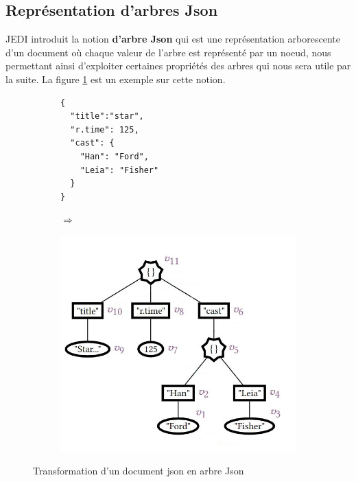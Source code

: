         \subsection{Représentation d'arbres Json}   
            JEDI \cite{JEDI} introduit la notion \textbf{d'arbre Json} qui est une représentation arborescente d'un document où chaque valeur de l'arbre est représenté par un noeud, nous permettant ainsi d'exploiter 
            certaines propriétés des arbres qui nous sera utile par la suite. La figure \ref{fig:transformation_json_en_arbre} est un exemple sur cette notion.
            \begin{figure}[H]
                \begin{subfigure}[H]{0.45\linewidth}
                    \begin{verbatim}
{
  "title":"star",
  "r.time": 125,
  "cast": {
    "Han": "Ford",
    "Leia": "Fisher"
  }
}
                    \end{verbatim}
                \end{subfigure}
                \begin{subfigure}[H]{0.05\linewidth}
                    $\Longrightarrow$
                \end{subfigure}
                \begin{subfigure}[H]{0.45\linewidth}
                    \begin{center}
                        \includegraphics[scale=0.5]{Photos/tree_representation.png}
                    \end{center} 
                \end{subfigure}
                \caption {Transformation d'un document json en arbre Json}
                \label{fig:transformation_json_en_arbre}
            \end{figure}

